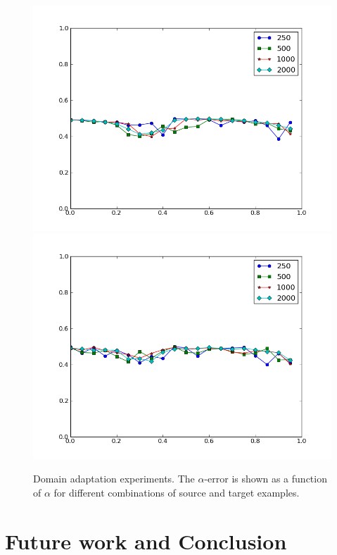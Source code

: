 \documentclass[letterpaper]{article}
\begin{document}
\begin{figure}[ht]
  \subfigure%
  {\includegraphics[scale=.3]{adaptation_err_S}}
  \subfigure%
  {\includegraphics[scale=.3]{adaptation_err_T}}
  \caption{Domain adaptation experiments. The $\alpha$-error is shown as a function of $\alpha$ for different combinations of source and target examples.}
  \label{fig:domain-adaptation}
\end{figure}

\section{Future work and Conclusion}
\label{sec:future-work}
\end{document}
